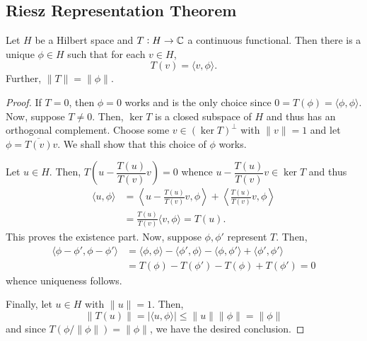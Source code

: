 \subsection{Riesz Representation Theorem}

\begin{theorem}[Riesz]
    Let $H$ be a Hilbert space and $T: H\to\mathbb{C}$ a continuous functional. Then there is a unique $\phi\in H$ such that for each $v\in H$, 
    \begin{equation*}
        T(v) = \langle v,\phi\rangle.
    \end{equation*}
    Further, $\|T\| = \|\phi\|$.
\end{theorem}
\begin{proof}
    If $T = 0$, then $\phi = 0$ works and is the only choice since $0 = T(\phi) = \langle\phi,\phi\rangle$. Now, suppose $T\ne 0$. Then, $\ker T$ is a closed subspace of $H$ and thus has an orthogonal complement. Choose some $v\in(\ker T)^\perp$ with $\|v\| = 1$ and let $\phi = \overline{T(v)}v$. We shall show that this choice of $\phi$ works.

    Let $u\in H$. Then, $T\left(u - \dfrac{T(u)}{T(v)}v\right) = 0$ whence $u - \dfrac{T(u)}{T(v)}v\in\ker T$ and thus 
    \begin{align*}
        \langle u, \phi\rangle &= \left\langle u - \frac{T(u)}{T(v)}v,\phi\right\rangle + \left\langle\frac{T(u)}{T(v)}v,\phi\right\rangle\\
        &= \frac{T(u)}{T(v)}\langle v,\phi\rangle = T(u).
    \end{align*}
    This proves the existence part. Now, suppose $\phi,\phi'$ represent $T$. Then, 
    \begin{align*}
        \langle\phi - \phi', \phi - \phi'\rangle &= \langle\phi,\phi\rangle  - \langle\phi',\phi\rangle - \langle\phi,\phi'\rangle + \langle\phi',\phi'\rangle\\
        &= T(\phi) - T(\phi') - T(\phi) + T(\phi') = 0
    \end{align*}
    whence uniqueness follows.

    Finally, let $u\in H$ with $\|u\| = 1$. Then, 
    \begin{equation*}
        \|T(u)\| = |\langle u,\phi\rangle|\le\|u\|\|\phi\| = \|\phi\|
    \end{equation*}
    and since $T(\phi/\|\phi\|) = \|\phi\|$, we have the desired conclusion.
\end{proof}